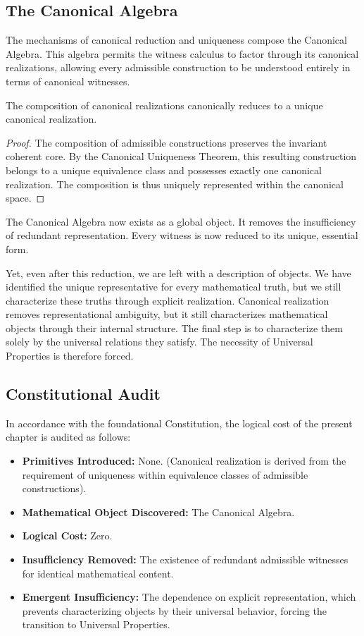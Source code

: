 \documentclass[12pt,anyside]{book}
\begin{document}
\subsection{The Canonical Algebra}
The mechanisms of canonical reduction and uniqueness compose the Canonical Algebra. This algebra permits the witness calculus to factor through its canonical realizations, allowing every admissible construction to be understood entirely in terms of canonical witnesses.

\begin{theorem}
The composition of canonical realizations canonically reduces to a unique canonical realization.
\end{theorem}
\begin{proof}
The composition of admissible constructions preserves the invariant coherent core. By the Canonical Uniqueness Theorem, this resulting construction belongs to a unique equivalence class and possesses exactly one canonical realization. The composition is thus uniquely represented within the canonical space.
\end{proof}

The Canonical Algebra now exists as a global object. It removes the insufficiency of redundant representation. Every witness is now reduced to its unique, essential form. 

Yet, even after this reduction, we are left with a description of objects. We have identified the unique representative for every mathematical truth, but we still characterize these truths through explicit realization. Canonical realization removes representational ambiguity, but it still characterizes mathematical objects through their internal structure. The final step is to characterize them solely by the universal relations they satisfy. The necessity of Universal Properties is therefore forced.

\subsection{Constitutional Audit}
In accordance with the foundational Constitution, the logical cost of the present chapter is audited as follows:
\begin{itemize}
    \item \textbf{Primitives Introduced:} None. (Canonical realization is derived from the requirement of uniqueness within equivalence classes of admissible constructions).
    \item \textbf{Mathematical Object Discovered:} The Canonical Algebra.
    \item \textbf{Logical Cost:} Zero.
    \item \textbf{Insufficiency Removed:} The existence of redundant admissible witnesses for identical mathematical content.
    \item \textbf{Emergent Insufficiency:} The dependence on explicit representation, which prevents characterizing objects by their universal behavior, forcing the transition to Universal Properties.
\end{itemize}
\end{document}
